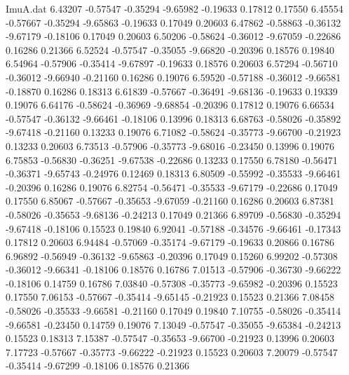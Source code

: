 \begin{filecontents}{ImuA.dat}
   6.43207   -0.57547   -0.35294   -9.65982   -0.19633    0.17812    0.17550
   6.45554   -0.57667   -0.35294   -9.65863   -0.19633    0.17049    0.20603
   6.47862   -0.58863   -0.36132   -9.67179   -0.18106    0.17049    0.20603
   6.50206   -0.58624   -0.36012   -9.67059   -0.22686    0.16286    0.21366
   6.52524   -0.57547   -0.35055   -9.66820   -0.20396    0.18576    0.19840
   6.54964   -0.57906   -0.35414   -9.67897   -0.19633    0.18576    0.20603
   6.57294   -0.56710   -0.36012   -9.66940   -0.21160    0.16286    0.19076
   6.59520   -0.57188   -0.36012   -9.66581   -0.18870    0.16286    0.18313
   6.61839   -0.57667   -0.36491   -9.68136   -0.19633    0.19339    0.19076
   6.64176   -0.58624   -0.36969   -9.68854   -0.20396    0.17812    0.19076
   6.66534   -0.57547   -0.36132   -9.66461   -0.18106    0.13996    0.18313
   6.68763   -0.58026   -0.35892   -9.67418   -0.21160    0.13233    0.19076
   6.71082   -0.58624   -0.35773   -9.66700   -0.21923    0.13233    0.20603
   6.73513   -0.57906   -0.35773   -9.68016   -0.23450    0.13996    0.19076
   6.75853   -0.56830   -0.36251   -9.67538   -0.22686    0.13233    0.17550
   6.78180   -0.56471   -0.36371   -9.65743   -0.24976    0.12469    0.18313
   6.80509   -0.55992   -0.35533   -9.66461   -0.20396    0.16286    0.19076
   6.82754   -0.56471   -0.35533   -9.67179   -0.22686    0.17049    0.17550
   6.85067   -0.57667   -0.35653   -9.67059   -0.21160    0.16286    0.20603
   6.87381   -0.58026   -0.35653   -9.68136   -0.24213    0.17049    0.21366
   6.89709   -0.56830   -0.35294   -9.67418   -0.18106    0.15523    0.19840
   6.92041   -0.57188   -0.34576   -9.66461   -0.17343    0.17812    0.20603
   6.94484   -0.57069   -0.35174   -9.67179   -0.19633    0.20866    0.16786
   6.96892   -0.56949   -0.36132   -9.65863   -0.20396    0.17049    0.15260
   6.99202   -0.57308   -0.36012   -9.66341   -0.18106    0.18576    0.16786
   7.01513   -0.57906   -0.36730   -9.66222   -0.18106    0.14759    0.16786
   7.03840   -0.57308   -0.35773   -9.65982   -0.20396    0.15523    0.17550
   7.06153   -0.57667   -0.35414   -9.65145   -0.21923    0.15523    0.21366
   7.08458   -0.58026   -0.35533   -9.66581   -0.21160    0.17049    0.19840
   7.10755   -0.58026   -0.35414   -9.66581   -0.23450    0.14759    0.19076
   7.13049   -0.57547   -0.35055   -9.65384   -0.24213    0.15523    0.18313
   7.15387   -0.57547   -0.35653   -9.66700   -0.21923    0.13996    0.20603
   7.17723   -0.57667   -0.35773   -9.66222   -0.21923    0.15523    0.20603
   7.20079   -0.57547   -0.35414   -9.67299   -0.18106    0.18576    0.21366

\end{filecontents}
